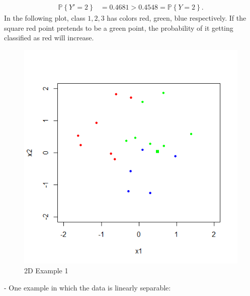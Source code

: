\documentclass{article}
\begin{document}
\begin{align*}
\mathbb{P}\left\{Y' = 2\right\} &= 0.4681 > 0.4548 = \mathbb{P}\left\{Y = 2\right\}.
\end{align*}
In the following plot, class $1, 2, 3$ has colors red, green, blue respectively. If the square red point pretends to be a green point, the probability of it getting classified as red will increase.
\begin{figure}[H]
\centering
\includegraphics[width=0.5\linewidth]{test2d_217}
\caption{2D Example 1}
\end{figure}
 -
\newline \newline
One example in which the data is linearly separable:
\end{document}
